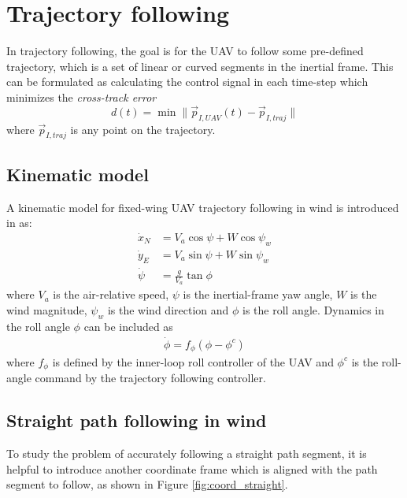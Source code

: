 \section{Trajectory following}
In trajectory following, the goal is for the UAV to follow some pre-defined trajectory, which is a set of 
linear or curved segments in the inertial frame. This can be formulated as calculating the control signal 
in each time-step which minimizes the \textit{cross-track error}
\begin{equation}
    d(t)=\min\|\vec{p}_{I,UAV}(t)-\vec{p}_{I,traj}\|
\end{equation}
where $\vec{p}_{I,traj}$ is any point on the trajectory. 

\subsection{Kinematic model}
A kinematic model for fixed-wing UAV trajectory following in wind is introduced in \cite{uav_dynamics_wind} as:
\begin{align}\label{eq:traj_model}
    \dot{x}_N &= V_a\cos\psi + W\cos\psi_w \\
    \dot{y}_E &= V_a\sin\psi + W\sin\psi_w \\
    \dot{\psi} &= \frac{g}{V_a}\tan\phi
\end{align}
where $V_a$ is the air-relative speed, $\psi$ is the inertial-frame yaw angle, $W$ is the wind magnitude, $\psi_w$ is the wind direction and $\phi$ is the roll angle.
Dynamics in the roll angle $\phi$ can be included as
\begin{align}
    \dot{\phi} = f_\phi(\phi-\phi^c)
\end{align}
where $f_\phi$ is defined by the inner-loop roll controller of the UAV and $\phi^c$ is the roll-angle command by the
trajectory following controller.
\subsection{Straight path following in wind}\label{sec:straight_path_wind}
To study the problem of accurately following a straight path segment, it is helpful to introduce another 
coordinate frame which is aligned with the path segment to follow, as shown in Figure \ref{fig:coord_straight}.

